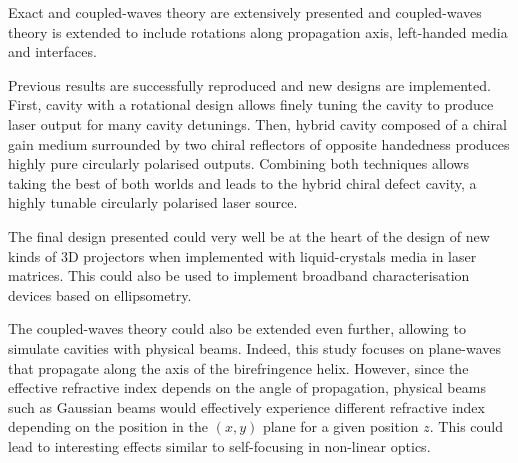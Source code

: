 Exact and coupled-waves theory are extensively presented and coupled-waves theory is extended to include rotations along propagation axis, left-handed media and interfaces. 

Previous results are successfully reproduced and new designs are implemented. First, cavity with a rotational design allows finely tuning the cavity to produce laser output for many cavity detunings. Then, hybrid cavity composed of a chiral gain medium surrounded by two chiral reflectors of opposite handedness produces highly pure circularly polarised outputs. Combining both techniques allows taking the best of both worlds and leads to the hybrid chiral defect cavity, a highly tunable circularly polarised laser source. 

The final design presented could very well be at the heart of the design of new kinds of 3D projectors when implemented with liquid-crystals media in laser matrices. This could also be used to implement broadband characterisation devices based on ellipsometry. 

The coupled-waves theory could also be extended even further, allowing to simulate cavities with physical beams. Indeed, this study focuses on plane-waves that propagate along the axis of the birefringence helix. However, since the effective refractive index depends on the angle of propagation, physical beams such as Gaussian beams would effectively experience different refractive index depending on the position in the $(x,y)$ plane for a given position $z$. This could lead to interesting effects similar to self-focusing in non-linear optics\cites{poy_chirality-enhanced_2020}{shishkov_polarisation_2020}.